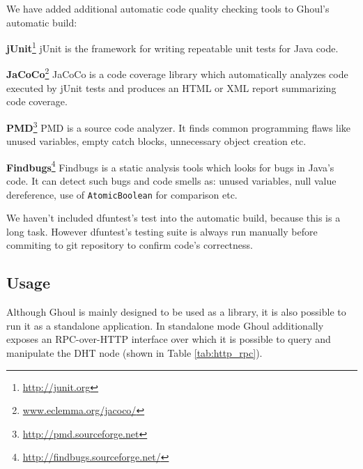 We have added additional automatic code quality checking tools to Ghoul's automatic build:

\begin{description}
  \item{\textbf{jUnit}\footnote{\url{http://junit.org}}} 
    jUnit is the framework for writing repeatable unit tests for Java code.
  \item{\textbf{JaCoCo}\footnote{\url{www.eclemma.org/jacoco/}}}
    JaCoCo is a code coverage library which automatically analyzes code executed by jUnit tests and produces an HTML or XML report summarizing code coverage.

  \item{\textbf{PMD}\footnote{\url{http://pmd.sourceforge.net}}}
    PMD is a source code analyzer.
    It finds common programming flaws like unused variables, empty catch blocks, unnecessary object creation etc.
  \item{\textbf{Findbugs}\footnote{\url{http://findbugs.sourceforge.net/}}}
    Findbugs is a static analysis tools which looks for bugs in Java's code.
    It can detect such bugs and code smells as: unused variables, null value
    dereference, use of \texttt{AtomicBoolean} for comparison etc.
    
\end{description}

We haven't included dfuntest's test into the automatic build, because this is a
long task.
However dfuntest's testing suite is always run manually before commiting to git
repository to confirm code's correctness.

\subsection{Usage}

Although Ghoul is mainly designed to be used as a library, it is also possible
to run it as a standalone application.
In standalone mode Ghoul additionally exposes an RPC-over-HTTP interface over
which it is possible to query and manipulate the DHT node (shown in Table
\ref{tab:http_rpc}).

